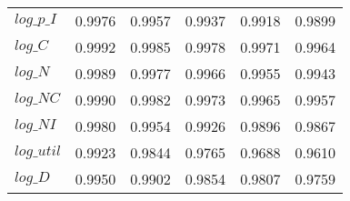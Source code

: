 \begin{center}
\begin{longtable}{lccccc}
$log\_p\_I  $	 & 	     0.9976	 & 	     0.9957	 & 	     0.9937	 & 	     0.9918	 & 	     0.9899 \\ 
$log\_C     $	 & 	     0.9992	 & 	     0.9985	 & 	     0.9978	 & 	     0.9971	 & 	     0.9964 \\ 
$log\_N     $	 & 	     0.9989	 & 	     0.9977	 & 	     0.9966	 & 	     0.9955	 & 	     0.9943 \\ 
$log\_NC    $	 & 	     0.9990	 & 	     0.9982	 & 	     0.9973	 & 	     0.9965	 & 	     0.9957 \\ 
$log\_NI    $	 & 	     0.9980	 & 	     0.9954	 & 	     0.9926	 & 	     0.9896	 & 	     0.9867 \\ 
$log\_util  $	 & 	     0.9923	 & 	     0.9844	 & 	     0.9765	 & 	     0.9688	 & 	     0.9610 \\ 
$log\_D     $	 & 	     0.9950	 & 	     0.9902	 & 	     0.9854	 & 	     0.9807	 & 	     0.9759 \\ 
\end{longtable}
 \end{center}
